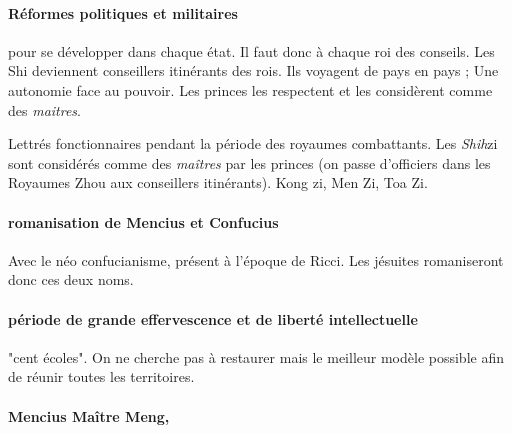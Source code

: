 \paragraph{Réformes politiques et militaires} pour se développer dans chaque état. Il faut donc à chaque roi des conseils. Les Shi deviennent conseillers itinérants des rois. Ils voyagent de pays en pays ; Une autonomie face au pouvoir. Les princes les respectent et les considèrent comme des \textit{maitres}. 
\begin{Def}[shi-h - 士 ]
    Lettrés fonctionnaires pendant la période des royaumes combattants.     Les \textit{Shih}{zi} sont considérés comme des \textit{maîtres} par les princes (on passe d'officiers dans les Royaumes Zhou aux conseillers itinérants). Kong zi, Men Zi, Toa Zi. 
\end{Def}
\paragraph{romanisation de Mencius et Confucius} Avec le néo confucianisme, présent à l'époque de Ricci. Les jésuites romaniseront donc ces deux noms.

\paragraph{période de grande effervescence et de liberté intellectuelle} "cent écoles". On ne cherche pas à restaurer mais le meilleur modèle possible afin de réunir toutes les territoires.

\paragraph{Mencius Maître Meng,}

